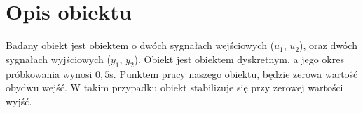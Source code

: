 \chapter{Opis obiektu}
Badany obiekt jest obiektem o dwóch sygnałach wejściowych ($u_1$, $u_2$), oraz
dwóch sygnałach wyjściowych ($y_1$, $y_2$). Obiekt jest obiektem dyskretnym,
a jego okres próbkowania wynosi $0,5$s. Punktem pracy naszego obiektu, będzie
zerowa wartość obydwu wejść. W takim przypadku obiekt stabilizuje się przy
zerowej wartości wyjść.
